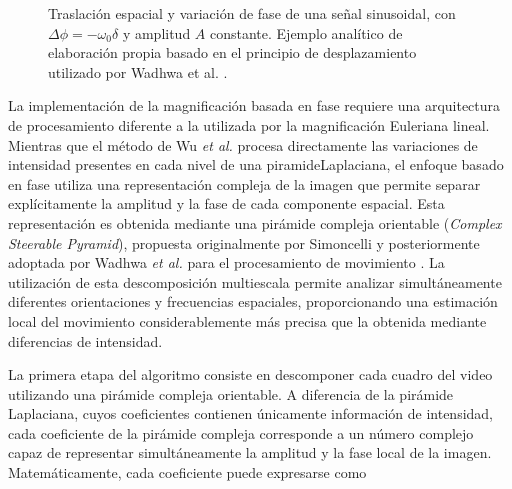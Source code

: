 \begin{figure}[htbp]
\centering
{}
\caption[Traslación espacial y variación de fase]{Traslación espacial y variación de fase de una señal sinusoidal, con $\Delta\phi=-\omega_0\delta$ y amplitud $A$ constante. Ejemplo analítico de elaboración propia basado en el principio de desplazamiento utilizado por Wadhwa et al. \cite{wadhwa2013phase}.}
\label{fig:fase_traslacion}
\end{figure}

La implementación de la magnificación basada en fase requiere una arquitectura de procesamiento diferente a la utilizada por la magnificación Euleriana lineal. Mientras que el método de Wu \textit{et al.} procesa directamente las variaciones de intensidad presentes en cada nivel de una \gls{piramideLaplaciana}, el enfoque basado en fase utiliza una representación compleja de la imagen que permite separar explícitamente la amplitud y la fase de cada componente espacial. Esta representación es obtenida mediante una pirámide compleja orientable (\textit{Complex Steerable Pyramid}), propuesta originalmente por Simoncelli y posteriormente adoptada por Wadhwa \textit{et al.} para el procesamiento de movimiento \cite{simoncelli1995steerable,wadhwa2013phase}. La utilización de esta descomposición multiescala permite analizar simultáneamente diferentes orientaciones y frecuencias espaciales, proporcionando una estimación local del movimiento considerablemente más precisa que la obtenida mediante diferencias de intensidad.

La primera etapa del algoritmo consiste en descomponer cada cuadro del video utilizando una pirámide compleja orientable. A diferencia de la pirámide Laplaciana, cuyos coeficientes contienen únicamente información de intensidad, cada coeficiente de la pirámide compleja corresponde a un número complejo capaz de representar simultáneamente la amplitud y la fase local de la imagen. Matemáticamente, cada coeficiente puede expresarse como

